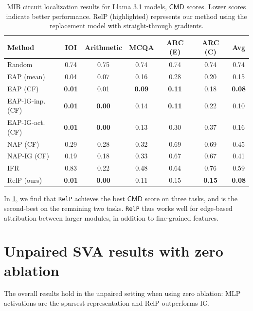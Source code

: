 \documentclass{article}
\theoremstyle{plain}
\theoremstyle{definition}
\theoremstyle{remark}
\begin{document}
\begin{table}[!h]
\centering
\small
\caption{MIB circuit localization results for Llama 3.1 models, $\mathsf{CMD}$ scores. Lower scores indicate better performance. RelP (highlighted) represents our method using the replacement model with straight-through gradients.}
\begin{tabular}{lcccccc}
\toprule
\textbf{Method} & \textbf{IOI} & \textbf{Arithmetic} & \textbf{MCQA} & \textbf{ARC (E)} & \textbf{ARC (C)} & \textbf{Avg} \\
\midrule
Random & 0.74 & 0.75 & 0.74 & 0.74 & 0.74 & 0.74 \\
EAP (mean) & 0.04 & 0.07 & 0.16 & 0.28 & 0.20 & 0.15 \\
EAP (CF) & \textbf{0.01} & 0.01 & \textbf{0.09} & \textbf{0.11} & 0.18 & \textbf{0.08} \\
EAP-IG-inp. (CF) & \textbf{0.01} & \textbf{0.00} & 0.14 & \textbf{0.11} & 0.22 & 0.10 \\
EAP-IG-act. (CF) & \textbf{0.01} & \textbf{0.00} & 0.13 & 0.30 & 0.37 & 0.16 \\
NAP (CF) & 0.29 & 0.28 & 0.32 & 0.69 & 0.69 & 0.45 \\
NAP-IG (CF) & 0.19 & 0.18 & 0.33 & 0.67 & 0.67 & 0.41 \\
IFR & 0.83 & 0.22 & 0.48 & 0.64 & 0.76 & 0.59 \\
\midrule
\rowcolor{blue!10}
RelP (ours) & \textbf{0.01} & \textbf{0.00} & 0.11 & 0.15 & \textbf{0.15} & \textbf{0.08} \\
\bottomrule
\end{tabular}
\label{tab:mib_results}
\end{table}


In \cref{tab:mib_results}, we find that \texttt{RelP} achieves the best $\mathsf{CMD}$ score on three tasks, and is the second-best on the remaining two tasks. \texttt{RelP} thus works
well for edge-based attribution between larger modules, in addition to fine-grained features.

\newpage
\section{Unpaired SVA results with zero ablation}
\label{sec:zero-abl-results}

The overall results hold in the unpaired setting when using zero ablation: MLP activations are the sparsest representation and RelP outperforms IG.
\end{document}
